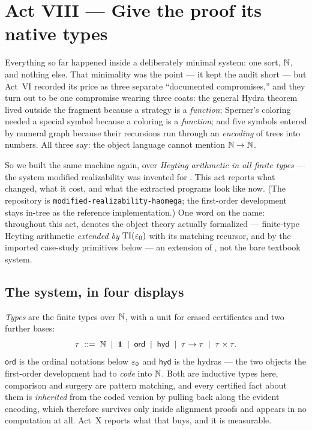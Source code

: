 \section{Act VIII --- Give the proof its native types}
\label{sec:haomega}

Everything so far happened inside a deliberately minimal system: one sort,
$\mathbb{N}$, and nothing else. That minimality was the point --- it kept the audit
short --- but Act~VI recorded its price as three separate ``documented
compromises,'' and they turn out to be one compromise wearing three coats:
the general Hydra theorem lived outside the fragment because a strategy is a
\emph{function}; Sperner's coloring needed a special symbol because a
coloring is a \emph{function}; and five symbols entered by numeral graph
because their recursions run through an \emph{encoding} of trees into
numbers. All three say: the object language cannot mention $\mathbb{N}\to\mathbb{N}$.

So we built the same machine again, over \emph{Heyting arithmetic in all
finite types} --- the system modified realizability was invented for
\citep{kreisel1959,troelstra1973}. This act reports what changed, what it
cost, and what the extracted programs look like now. (The repository is
\texttt{modified-realizability-haomega}; the first-order development stays
in-tree as the reference implementation.) One word on the name: throughout
this act, \haomega{} denotes the object theory actually formalized ---
finite-type Heyting arithmetic \emph{extended by} $\mathrm{TI}(\varepsilon_0)$ with
its matching recursor, and by the imported case-study primitives below ---
an extension of \haomega{}, not the bare textbook system.

\subsection*{The system, in four displays}

\emph{Types} are the finite types over $\mathbb{N}$, with a unit for erased
certificates and two further bases:
\[
  \tau \;::=\; \mathbb{N} \;\mid\; \mathbf{1} \;\mid\; \mathsf{ord}
  \;\mid\; \mathsf{hyd} \;\mid\; \tau\to\tau \;\mid\; \tau\times\tau .
\]
$\mathsf{ord}$ is the ordinal notations below $\varepsilon_0$ and $\mathsf{hyd}$ is
the hydras --- the two objects the first-order development had to \emph{code}
into $\mathbb{N}$. Both are inductive types here, comparison and surgery are pattern
matching, and every certified fact about them is \emph{inherited} from the
coded version by pulling back along the evident encoding, which therefore
survives only inside alignment proofs and appears in no computation at all.
Act~X reports what that buys, and it is measurable.

